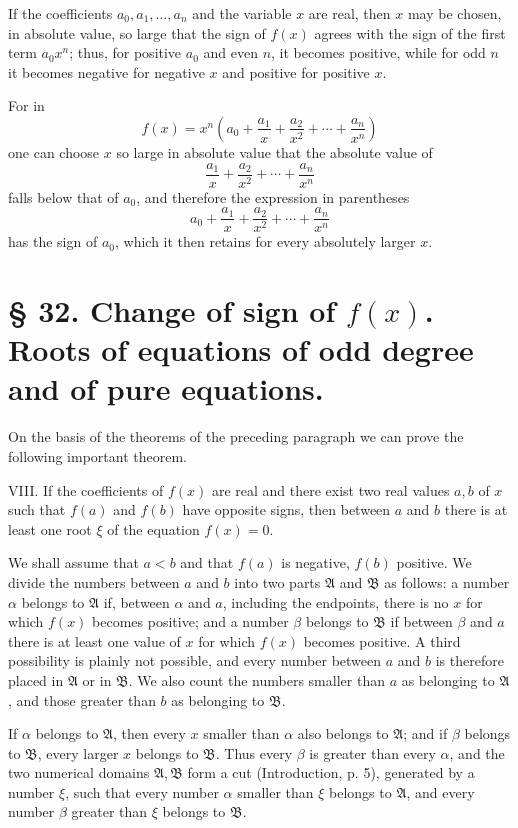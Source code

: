 \documentclass[11pt]{article}
\begin{document}
If the coefficients $a_0,a_1,\ldots,a_n$ and the variable $x$ are real, then $x$ may be chosen, in absolute value, so large that the sign of $f(x)$ agrees with the sign of the first term $a_0x^n$; thus, for positive $a_0$ and even $n$, it becomes positive, while for odd $n$ it becomes negative for negative $x$ and positive for positive $x$.

For in
\[
 f(x)=x^n\left(a_0+\frac{a_1}{x}+\frac{a_2}{x^2}+\cdots+\frac{a_n}{x^n}\right)
\]
one can choose $x$ so large in absolute value that the absolute value of
\[
 \frac{a_1}{x}+\frac{a_2}{x^2}+\cdots+\frac{a_n}{x^n}
\]
falls below that of $a_0$, and therefore the expression in parentheses
\[
 a_0+\frac{a_1}{x}+\frac{a_2}{x^2}+\cdots+\frac{a_n}{x^n}
\]
has the sign of $a_0$, which it then retains for every absolutely larger $x$.

\section*{§ 32. Change of sign of $f(x)$. Roots of equations of odd degree and of pure equations.}

On the basis of the theorems of the preceding paragraph we can prove the following important theorem.

\medskip
\noindent VIII. If the coefficients of $f(x)$ are real and there exist two real values $a,b$ of $x$ such that $f(a)$ and $f(b)$ have opposite signs, then between $a$ and $b$ there is at least one root $\xi$ of the equation $f(x)=0$.
\medskip

We shall assume that $a<b$ and that $f(a)$ is negative, $f(b)$ positive. We divide the numbers between $a$ and $b$ into two parts $\mathfrak A$ and $\mathfrak B$ as follows: a number $\alpha$ belongs to $\mathfrak A$ if, between $\alpha$ and $a$, including the endpoints, there is no $x$ for which $f(x)$ becomes positive; and a number $\beta$ belongs to $\mathfrak B$ if between $\beta$ and $a$ there is at least one value of $x$ for which $f(x)$ becomes positive. A third possibility is plainly not possible, and every number between $a$ and $b$ is therefore placed in $\mathfrak A$ or in $\mathfrak B$. We also count the numbers smaller than $a$ as belonging to $\mathfrak A$, and those greater than $b$ as belonging to $\mathfrak B$.

If $\alpha$ belongs to $\mathfrak A$, then every $x$ smaller than $\alpha$ also belongs to $\mathfrak A$; and if $\beta$ belongs to $\mathfrak B$, every larger $x$ belongs to $\mathfrak B$. Thus every $\beta$ is greater than every $\alpha$, and the two numerical domains $\mathfrak A,\mathfrak B$ form a cut (Introduction, p. 5), generated by a number $\xi$, such that every number $\alpha$ smaller than $\xi$ belongs to $\mathfrak A$, and every number $\beta$ greater than $\xi$ belongs to $\mathfrak B$.
\end{document}
